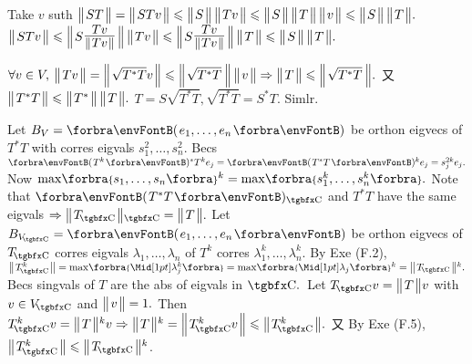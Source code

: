 Take $v$ suth $\big\Vert\hspace{1pt}{}ST{}\hspace{1pt}\big\Vert=\big\Vert\hspace{1pt}{}STv{}\hspace{1pt}\big\Vert\leqslant\big\Vert\hspace{1pt}{}S{}\hspace{1pt}\big\Vert\,\big\Vert\hspace{1pt}{}Tv{}\hspace{1pt}\big\Vert\leqslant\big\Vert\hspace{1pt}{}S{}\hspace{1pt}\big\Vert\,\big\Vert\hspace{1pt}{}T{}\hspace{1pt}\big\Vert\,\big\Vert\hspace{1pt}{}v{}\hspace{1pt}\big\Vert\leqslant\big\Vert\hspace{1pt}{}S{}\hspace{1pt}\big\Vert\,\big\Vert\hspace{1pt}{}T{}\hspace{1pt}\big\Vert.$\PfEnd\vspace{3pt}\parSol{}
\Or $\Dvert{STv}\leqslant\BigDvert{S${\Large$\frac{\:Tv\:}{\SmallDvert{Tv}}$}$}\,\Dvert{Tv}\leqslant\BigDvert{S${\Large$\frac{\:Tv\:}{\SmallDvert{Tv}}$}$}\,\Dvert{T}\leqslant\Dvert{S}\,\Dvert{T}.$\PfEnd
\SepLine

$\forall v\in V,\:\big\Vert\hspace{1pt}{}Tv{}\hspace{1pt}\big\Vert=\Big\Vert\hspace{1pt}{}\sqrt{T^*T}v{}\hspace{1pt}\Big\Vert\leqslant\Big\Vert\hspace{1pt}{}\sqrt{T^*T}\;\!{}\hspace{1pt}\Big\Vert\,\big\Vert\hspace{1pt}{}v{}\hspace{1pt}\big\Vert\Rightarrow\big\Vert\hspace{1pt}{}T{}\hspace{1pt}\big\Vert\leqslant\Big\Vert\hspace{1pt}{}\sqrt{T^*T}\;\!{}\hspace{1pt}\Big\Vert.$ 又 $\big\Vert\hspace{1pt}{}T^*T{}\hspace{1pt}\big\Vert\leqslant\big\Vert\hspace{1pt}{}T^*{}\hspace{1pt}\big\Vert\,\big\Vert\hspace{1pt}{}T{}\hspace{1pt}\big\Vert.$\PfEnd\vspace{2pt}\parSol{}
\Or $T=S\sqrt{T^*T},\sqrt{T^*T}=S^*T.$ Simlr.\PfEnd
\SepLine

Let $B_V=\Par{e_1,\dots,e_n}$ be orthon eigvecs of $T^*T$ with corres eigvals $s_1^2,\dots,s_n^2.$\parSol{}
Becs $\Par{T^k}{^*}T^ke_j=\Par{T^*T}{^k}e_j=s_j^{2k}e_j.$ \;Now $\max\!\Bra{s_1,\dots,s_n}{^k}=\max\!\Bra{s_1^k,\dots,s_n^k}.$\PfEnd\vspace{3pt}\parSol{}
\Or Note that $\Par{T^*T}{_\Cbb}$ and $T^*T$ have the same eigvals
$\Rightarrow\Dvert{T_{\!\Cbb}}{_\Cbb}=\Dvert{T}.$\parSol{}
Let $B_{V_{\!\Cbb}}=\Par{e_1,\dots,e_n}$ be orthon eigvecs of $T_{\!\Cbb}$ corres eigvals $\lambda_1,\dots,\lambda_n$ of $T^k$ corres $\lambda_1^k,\dots,\lambda_n^k.$\parSol{}
By Exe (F.2), $\Dvert{T_{\!\Cbb}^k}=\max\!\Bra{\aMid{\lambda_j^k}}=\max\!\Bra{\aMid{\lambda_j}}{^k}=\Dvert{T_{\!\Cbb}}{^k}.$\PfEnd\vspace{2pt}\parSol{}
\Or Becs singvals of $T$ are the abs of eigvals in $\Cbb.$ \,Let $T_{\!\Cbb}v=\Dvert{T}v$ with $v\in V_{\!\Cbb}$ and $\big\Vert\hspace{1pt}{}v{}\hspace{1pt}\big\Vert=1.$\parSol{}
Then $T_{\!\Cbb}^kv=\Dvert{T}{^k}v\Rightarrow\Dvert{T}{^k}=\BigDvert{T_{\!\Cbb}^kv}\leqslant\Dvert{T_{\!\Cbb}^k}.$ \;又 By Exe (F.5), $\Dvert{T_{\!\Cbb}^k}\leqslant\Dvert{T_{\!\Cbb}}{^k}$.\PfEnd
\SepLine




